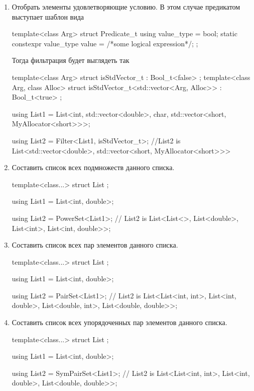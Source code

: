 \begin{enumerate}
\item Отобрать элементы удовлетворяющие условию.
В этом случае предикатом выступает шаблон вида
\begin{cppcode}
template<class Arg>
struct Predicate_t {
  using value_type = bool;
  static constexpr value_type value = /*some logical expression*/;
};
\end{cppcode}
Тогда фильтрация будет выглядеть так
\begin{cppcode}
template<class Arg>
struct isStdVector_t : Bool_t<false> {};
template<class Arg, class Alloc>
struct isStdVector_t<std::vector<Arg, Alloc>> : Bool_t<true> {};

using List1 = List<int, std::vector<double>, char, std::vector<short, MyAllocator<short>>>;

using List2 = Filter<List1, isStdVector_t>;
//List2 is  List<std::vector<double>, std::vector<short, MyAllocator<short>>>
\end{cppcode}

\item Составить список всех подмножеств данного списка.
\begin{cppcode}
template<class...>
struct List {};

using List1 = List<int, double>;

using List2 = PowerSet<List1>;
// List2 is List<List<>, List<double>, List<int>, List<int, double>>;
\end{cppcode}


\item Составить список всех пар элементов данного списка.
\begin{cppcode}
template<class...>
struct List {};

using List1 = List<int, double>;

using List2 = PairSet<List1>;
// List2 is List<List<int, int>, List<int, double>, List<double, int>, List<double, double>>;
\end{cppcode}

\item Составить список всех упорядоченных пар элементов данного списка.
\begin{cppcode}
template<class...>
struct List {};

using List1 = List<int, double>;

using List2 = SymPairSet<List1>;
// List2 is List<List<int, int>, List<int, double>, List<double, double>>;
\end{cppcode}
\end{enumerate}


